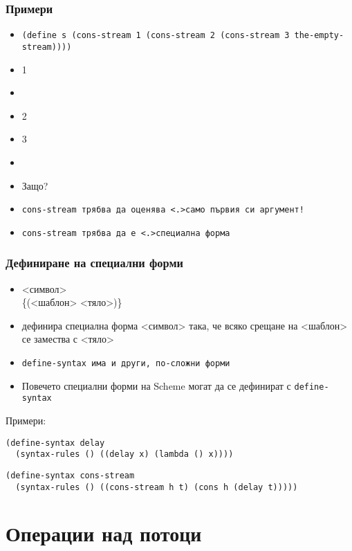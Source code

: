 \documentclass{beamer}
\begin{document}
\begin{frame}
  \frametitle{Примери}
  \begin{itemize}[<+->]
  \item \tt{(define s (cons-stream 1 (cons-stream 2 (cons-stream 3 the-empty-stream))))}
  \item {}1
  \item {}
  \item {}2
  \item {}3
  \item {}
  \item<+-| alert@+>Защо?
  \item \tt{cons-stream} трябва да оценява \alert<.>{само първия си аргумент}!
  \item \tt{cons-stream} трябва да е \alert<.>{специална форма}
  \end{itemize}
\end{frame}

\begin{frame}[fragile]
  \frametitle{Дефиниране на специални форми}
  \begin{itemize}[<+->]
  \item {} <символ>\\
    \hspace{5ex}\{\tta(<шаблон> <тяло>\tta)\}\tta{))}
  \item дефинира специална форма <символ> така, че всяко срещане на <шаблон> се замества с <тяло>
  \item \tt{define-syntax} има и други, по-сложни форми
  \item Повечето специални форми на Scheme могат да се дефинират с \tt{define-syntax}
  \end{itemize}
  \pause
  Примери:
  \pause
\begin{verbatim}
(define-syntax delay
  (syntax-rules () ((delay x) (lambda () x))))
\end{verbatim}
  \pause
\begin{verbatim}
(define-syntax cons-stream
  (syntax-rules () ((cons-stream h t) (cons h (delay t)))))
\end{verbatim}
\end{frame}

\section{Операции над потоци}
\end{document}
